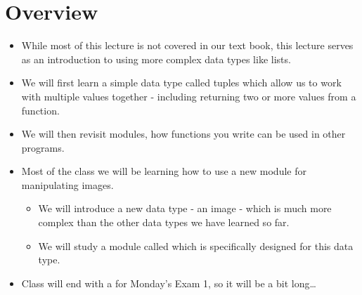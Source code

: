 \documentclass[letterpaper,10pt,english]{sphinxmanual}
\begin{document}
\section{Overview}
\label{\detokenize{lecture_notes/lec07_modules_images:overview}}\begin{itemize}
\item {} 
While most of this lecture is not covered in our text book, this
lecture serves as an introduction to using more complex data types
like lists.

\item {} 
We will first learn a simple data type called tuples which allow
us to work with multiple values together - including returning two
or more values from a function.

\item {} 
We will then revisit modules, how functions you write can be used
in other programs.

\item {} 
Most of the class we will be learning how to use a new module for
manipulating images.
\begin{itemize}
\item {} 
We will introduce a new data type - an image - which is much more
complex than the other data types we have learned so far.

\item {} 
We will study a module called  which is specifically
designed for this data type.

\end{itemize}

\item {} 
Class will end with a  for Monday’s Exam 1, so it will be a
bit long…

\end{itemize}
\end{document}
